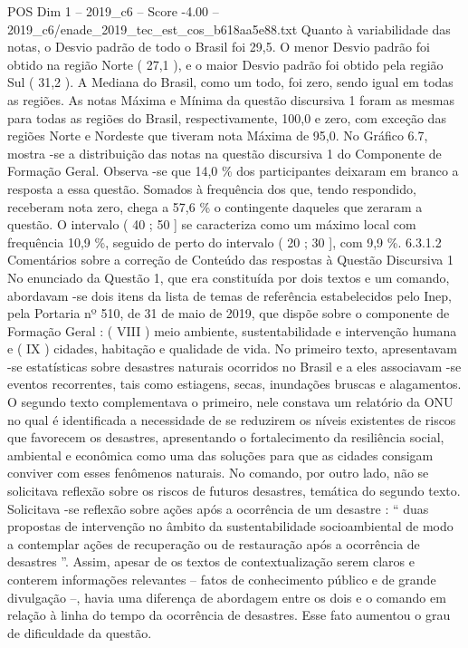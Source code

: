 \begin{textsample}{POS Dim 1 – 2019\_c6 – Score -4.00 – 2019\_c6/enade\_2019\_tec\_est\_cos\_b618aa5e88.txt}
Quanto à variabilidade das notas, o Desvio padrão de todo o Brasil foi 29,5.
O menor Desvio padrão foi obtido na região Norte ( 27,1 ), e o maior Desvio padrão foi obtido pela região Sul ( 31,2 ).
A Mediana do Brasil, como um todo, foi zero, sendo igual em todas as regiões.
As notas Máxima e Mínima da questão discursiva 1 foram as mesmas para todas as regiões do Brasil, respectivamente, 100,0 e zero, com exceção das regiões Norte e Nordeste que tiveram nota Máxima de 95,0.
No Gráfico 6.7, mostra -se a distribuição das notas na questão discursiva 1 do Componente de Formação Geral.
Observa -se que 14,0 \% dos participantes deixaram em branco a resposta a essa questão.
Somados à frequência dos que, tendo respondido, receberam nota zero, chega a 57,6 \% o contingente daqueles que zeraram a questão.
O intervalo ( 40 ; 50 ] se caracteriza como um máximo local com frequência 10,9 \%, seguido de perto do intervalo ( 20 ; 30 ], com 9,9 \%. 6.3.1.2 Comentários sobre a correção de Conteúdo das respostas à Questão Discursiva 1 No enunciado da Questão 1, que era constituída por dois textos e um comando, abordavam -se dois itens da lista de temas de referência estabelecidos pelo Inep, pela Portaria nº 510, de 31 de maio de 2019, que dispõe sobre o componente de Formação Geral : ( VIII ) meio ambiente, sustentabilidade e intervenção humana e ( IX ) cidades, habitação e qualidade de vida.
No primeiro texto, apresentavam -se estatísticas sobre desastres naturais ocorridos no Brasil e a eles associavam -se eventos recorrentes, tais como estiagens, secas, inundações bruscas e alagamentos.
O segundo texto complementava o primeiro, nele constava um relatório da ONU no qual é identificada a necessidade de se reduzirem os níveis existentes de riscos que favorecem os desastres, apresentando o fortalecimento da resiliência social, ambiental e econômica como uma das soluções para que as cidades consigam conviver com esses fenômenos naturais.
No comando, por outro lado, não se solicitava reflexão sobre os riscos de futuros desastres, temática do segundo texto.
Solicitava -se reflexão sobre ações após a ocorrência de um desastre : “ duas propostas de intervenção no âmbito da sustentabilidade socioambiental de modo a contemplar ações de recuperação ou de restauração após a ocorrência de desastres ”.
Assim, apesar de os textos de contextualização serem claros e conterem informações relevantes – fatos de conhecimento público e de grande divulgação –, havia uma diferença de abordagem entre os dois e o comando em relação à linha do tempo da ocorrência de desastres.
Esse fato aumentou o grau de dificuldade da questão.

\end{textsample}
